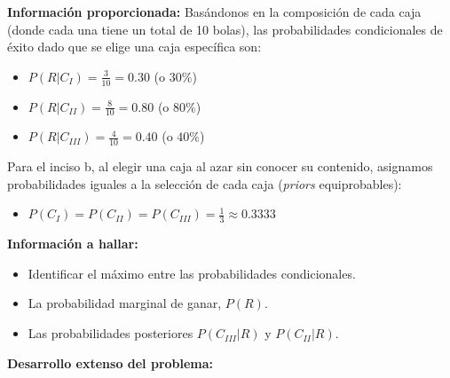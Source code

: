 \documentclass[a4paper]{article}
\begin{document}
\textbf{Información proporcionada:}
Basándonos en la composición de cada caja (donde cada una tiene un total de 10 bolas), las probabilidades condicionales de éxito dado que se elige una caja específica son:
\begin{itemize}
    \item $P(R|C_I) = \frac{3}{10} = 0.30$ (o $30\%$)
    \item $P(R|C_{II}) = \frac{8}{10} = 0.80$ (o $80\%$)
    \item $P(R|C_{III}) = \frac{4}{10} = 0.40$ (o $40\%$)
\end{itemize}
Para el inciso b, al elegir una caja al azar sin conocer su contenido, asignamos probabilidades iguales a la selección de cada caja (\textit{priors} equiprobables):
\begin{itemize}
    \item $P(C_I) = P(C_{II}) = P(C_{III}) = \frac{1}{3} \approx 0.3333$
\end{itemize}

\textbf{Información a hallar:}
\begin{itemize}
    \item Identificar el máximo entre las probabilidades condicionales.
    \item La probabilidad marginal de ganar, $P(R)$.
    \item Las probabilidades posteriores $P(C_{III}|R)$ y $P(C_{II}|R)$.
\end{itemize}

\textbf{Desarrollo extenso del problema:}
\end{document}
